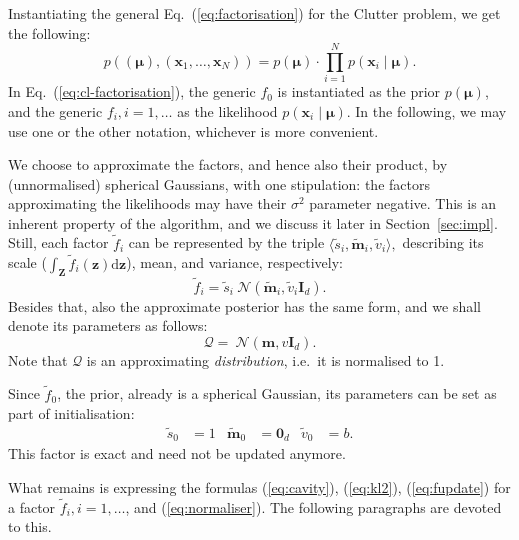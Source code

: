 \documentclass[11pt]{article}
\newcommand{\vek}[1]{\ensuremath{\mathbf{#1}}}
\newcommand{\kve}{\ensuremath{\mathcal{Q}}}
\newcommand{\byd}{\ensuremath{\mathrm{d}}}
\newcommand{\norm}{\ensuremath{\:\mathcal{N}}}
\newcommand{\unity}{\ensuremath{\mathbf{I}}}
\begin{document}
Instantiating the general Eq.~(\ref{eq:factorisation}) for the Clutter 
problem, we get the following:
\begin{equation}
	p((\boldsymbol{\mu}), (\vek{x}_1, \dots, \vek{x}_N)) = p(\boldsymbol{\mu}) \cdot \prod_{i 
	= 1}^{N}{p(\vek{x}_i\mid\boldsymbol{\mu})}.
	\label{eq:cl-factorisation}
\end{equation}
In Eq.~(\ref{eq:cl-factorisation}), the generic $f_0$ is instantiated as 
the prior $p(\boldsymbol{\mu})$, and the generic $f_i, i = 1,\dots$ as the likelihood
$p(\vek{x}_i\mid\boldsymbol{\mu})$. In the following, we may use one or the other notation, 
whichever is more convenient.

We choose to approximate the factors, and hence also their product, by 
(unnormalised) spherical Gaussians, with one stipulation: the factors 
approximating the likelihoods may have their $\sigma^2$ parameter negative.  
This is an inherent property of the algorithm, and we discuss it later in 
Section~\ref{sec:impl}. Still, each factor $\tilde{f}_i$ can be represented 
by the triple $\langle \tilde{s}_i, \vek{\tilde{m}}_i, \tilde{v}_i\rangle,$ 
describing its scale ($\int_{\vek{Z}} \tilde{f}_i(\vek{z})\byd\vek{z}$), 
mean, and variance, respectively:
\begin{equation}
	\tilde{f}_i = \tilde{s}_i\norm(\vek{\tilde{m}}_i, \tilde{v}_i\unity_{d}).
	\label{eq:fac-notation}
\end{equation}
Besides that, also the approximate posterior has the same form, and we 
shall denote its parameters as follows:
\begin{equation}
	\kve = \norm(\vek{m}, v\unity_{d}).
	\label{eq:kve-notation}
\end{equation}
Note that $\kve$ is an approximating \emph{distribution}, i.e.\ it is 
normalised to 1.

Since $\tilde{f}_0$, the prior, already is a spherical Gaussian, its 
parameters can be set as part of initialisation:
\begin{align}
	\tilde{s}_0 &= 1 &
	\tilde{\vek{m}}_0 &= \vek{0}_d &
	\tilde{v}_0 &= b.
\end{align}
This factor is exact and need not be updated anymore.

What remains is expressing the formulas (\ref{eq:cavity}), (\ref{eq:kl2}), 
(\ref{eq:fupdate}) for a factor $\tilde{f}_i, i=1, \dots$, and 
(\ref{eq:normaliser}).  The following paragraphs are devoted to this.

\end{document}

